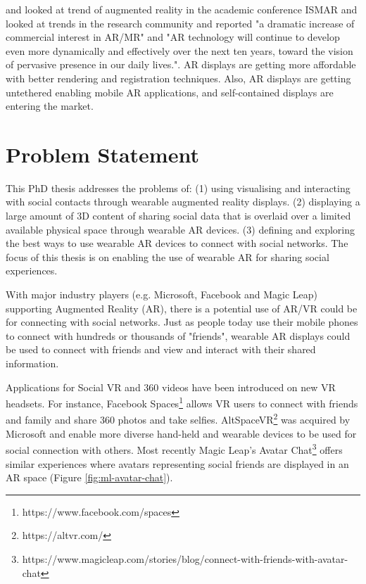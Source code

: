 \cite{Zhou2008} and \cite{Kim2018} looked at trend of augmented reality in the academic conference ISMAR and looked at trends in the research community and reported "a dramatic increase of commercial interest in AR/MR" and "AR technology will continue to develop even more dynamically and effectively over the next ten years, toward the vision of pervasive presence in our daily lives.". AR displays are getting more affordable with better rendering and registration techniques. Also, AR displays are getting untethered enabling mobile AR applications, and self-contained displays are entering the market.

\section{Problem Statement}

This PhD thesis addresses the problems of: 
(1) using visualising and interacting with social contacts through wearable augmented reality displays. 
(2) displaying a large amount of 3D content of sharing social data that is overlaid over a limited available physical space through wearable AR devices. 
(3) defining and exploring the best ways to use wearable AR devices to connect with social networks.
The focus of this thesis is on enabling the use of wearable AR for sharing social experiences. 


With major industry players (e.g. Microsoft, Facebook and Magic Leap) supporting Augmented Reality (AR), there is a potential use of AR/VR could be for connecting with social networks. Just as people today use their mobile phones to connect with hundreds or thousands of "friends", wearable AR displays could be used to connect with friends and view and interact with their shared information.

Applications for Social VR and 360 videos have been introduced on new VR headsets. For instance, Facebook Spaces\footnote{https://www.facebook.com/spaces} allows VR users to connect with friends and family and share 360 photos and take selfies. AltSpaceVR\footnote{https://altvr.com/} was acquired by Microsoft and enable more diverse hand-held and wearable devices to be used for social connection with others. Most recently Magic Leap's Avatar Chat\footnote{https://www.magicleap.com/stories/blog/connect-with-friends-with-avatar-chat} offers similar experiences where avatars representing social friends are displayed in an AR space (Figure \ref{fig:ml-avatar-chat}). 



